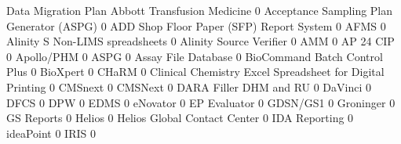 \documentclass{article}
\begin{document}
\begin{Schunk}
\begin{Soutput}
                                                            Data Migration Plan
  Abbott Transfusion Medicine                                                 0
  Acceptance Sampling Plan Generator (ASPG)                                   0
  ADD Shop Floor Paper (SFP) Report System                                    0
  AFMS                                                                        0
  Alinity S Non-LIMS spreadsheets                                             0
  Alinity Source Verifier                                                     0
  AMM                                                                         0
  AP 24 CIP                                                                   0
  Apollo/PHM                                                                  0
  ASPG                                                                        0
  Assay File Database                                                         0
  BioCommand Batch Control Plus                                               0
  BioXpert                                                                    0
  CHaRM                                                                       0
  Clinical Chemistry Excel Spreadsheet for Digital Printing                   0
  CMSnext                                                                     0
  CMSNext                                                                     0
  DARA Filler DHM and RU                                                      0
  DaVinci                                                                     0
  DFCS                                                                        0
  DPW                                                                         0
  EDMS                                                                        0
  eNovator                                                                    0
  EP Evaluator                                                                0
  GDSN/GS1                                                                    0
  Groninger                                                                   0
  GS Reports                                                                  0
  Helios                                                                      0
  Helios Global Contact Center                                                0
  IDA Reporting                                                               0
  ideaPoint                                                                   0
  IRIS                                                                        0

\end{Soutput}
\end{Schunk}
\end{document}
